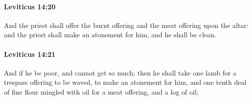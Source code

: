 		\paragraph{Leviticus 14:20} %
			\label{LEVITICUS-14-20}

			And the priest shall offer the burnt offering and the meat offering upon the altar: and the priest shall make an atonement for him, and he shall be clean.


		\paragraph{Leviticus 14:21} %
			\label{LEVITICUS-14-21}

			And if he be poor, and cannot get so much; then he shall take one lamb for a trespass offering to be waved, to make an atonement for him, and one tenth deal of fine flour mingled with oil for a meat offering, and a log of oil;

